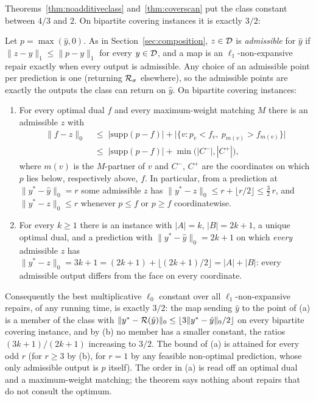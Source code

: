 Theorems~\ref{thm:noadditiveclass} and~\ref{thm:coverscan} put the class constant between $4/3$
and $2$. On bipartite covering instances it is exactly $3/2$:

\begin{theorem}\label{thm:threehalves}
Let $p = \max(\hat y, 0)$. As in Section~\ref{sec:composition}, $z \in \mathcal{D}$ is
\emph{admissible} for $\hat y$ if $\|z - y\|_1 \le \|p - y\|_1$ for every $y \in \mathcal{D}$, and a map
is an $\ell_1$-non-expansive repair exactly when every output is admissible. Any choice of an
admissible point per prediction is one (returning $\mathcal{R}_\sigma$ elsewhere), so the admissible
points are exactly the outputs the class can return on $\hat y$. On bipartite covering instances:
\begin{enumerate}
\item[(a)] For every optimal dual $f$ and every maximum-weight matching $M$ there is an admissible
$z$ with
\begin{align*}
  \|f - z\|_0 \;&\le\; |\mathrm{supp}(p - f)| + \bigl|\{ v : p_v < f_v,\ p_{m(v)} > f_{m(v)} \}\bigr| \\
  \;&\le\; |\mathrm{supp}(p - f)| + \min\bigl(|C^-|, |C^+|\bigr),
\end{align*}
where $m(v)$ is the $M$-partner of $v$ and $C^-$, $C^+$ are the coordinates on which $p$ lies
below, respectively above, $f$. In particular, from a prediction at $\|y^* - \hat y\|_0 = r$ some
admissible $z$ has $\|y^* - z\|_0 \le r + \lfloor r/2 \rfloor \le \tfrac{3}{2}\,r$, and
$\|y^* - z\|_0 \le r$ whenever $p \le f$ or $p \ge f$ coordinatewise.
\item[(b)] For every $k \ge 1$ there is an instance with $|A| = k$, $|B| = 2k+1$, a unique optimal
dual, and a prediction with $\|y^* - \hat y\|_0 = 2k+1$ on which \emph{every} admissible $z$ has
$\|y^* - z\|_0 = 3k+1 = (2k+1) + \lfloor (2k+1)/2 \rfloor = |A| + |B|$: every admissible output
differs from the face on every coordinate.
\end{enumerate}
Consequently the best multiplicative $\ell_0$ constant over all $\ell_1$-non-expansive repairs, of
any running time, is exactly $3/2$: the map sending $\hat y$ to the point of (a) is a member of the
class with $\|y^* - \mathcal{R}(\hat y)\|_0 \le \lfloor 3\|y^* - \hat y\|_0 / 2 \rfloor$ on every
bipartite covering instance, and by (b) no member has a smaller constant, the ratios $(3k+1)/(2k+1)$
increasing to $3/2$. The bound of (a) is attained for every odd $r$ (for $r \ge 3$ by (b), for
$r = 1$ by any feasible non-optimal prediction, whose only admissible output is $p$ itself).
The order in (a) is read off an
optimal dual and a maximum-weight matching; the theorem says nothing about repairs that do not
consult the optimum.
\end{theorem}

